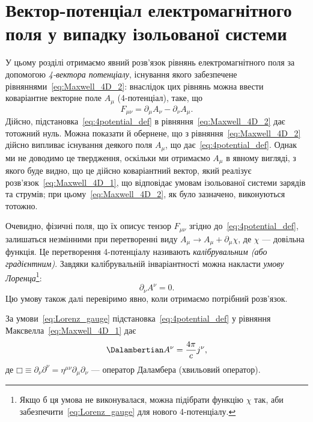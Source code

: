 \section{Вектор-потенціал електромагнітного поля у випадку ізольованої системи}

У цьому розділі отримаємо явний розв'язок рівнянь електромагнітного поля за допомогою \emph{4-вектора потенціалу}, існування якого забезпечене рівняннями~\eqref{eq:Maxwell_4D_2}: внаслідок цих рівнянь можна ввести коваріантне векторне поле $A_{\mu}$ (4-потенціал), таке, що
\begin{equation}\label{eq:4potential_def}
    F_{\mu\nu} = \partial_{\mu}A_{\nu} - \partial_{\nu}A_{\mu}.
\end{equation}
Дійсно, підстановка~\eqref{eq:4potential_def} в рівняння~\eqref{eq:Maxwell_4D_2} дає тотожний нуль. Можна показати й обернене, що з рівняння~\eqref{eq:Maxwell_4D_2} дійсно випливає існування деякого поля $A_{\mu}$, що дає~\eqref{eq:4potential_def}. Однак ми не доводимо це твердження, оскільки ми отримаємо $A_{\mu}$ в явному вигляді, з якого буде видно, що це дійсно коваріантний вектор, який реалізує розв'язок~\eqref{eq:Maxwell_4D_1}, що відповідає умовам ізольованої системи зарядів та струмів; при цьому~\eqref{eq:Maxwell_4D_2}, як було зазначено, виконуються тотожно.

Очевидно, фізичні поля, що їх описує тензор $F_{\mu\nu}$ згідно до~\eqref{eq:4potential_def}, залишаться незмінними при перетворенні виду $A_{\mu}\to A_{\mu}+\partial_{\mu}\chi$, де $\chi$ --- довільна функція. Це перетворення 4-потенціалу називають \emph{калібрувальним (або градієнтним)}. Завдяки калібрувальній інваріантності можна накласти \emph{умову Лоренца}\footnote{Якщо б ця умова не виконувалася, можна підібрати функцію $\chi$ так, аби забезпечити~\eqref{eq:Lorenz_gauge} для нового 4-потенціалу.}:
\begin{equation}\label{eq:Lorenz_gauge}
    \partial_{\nu}A^{\nu} = 0.
\end{equation}
Цю умову також далі перевіримо явно, коли отримаємо потрібний розв'язок.

За умови~\eqref{eq:Lorenz_gauge} підстановка~\eqref{eq:4potential_def} у рівняння Максвелла~\eqref{eq:Maxwell_4D_1} дає
\begin{equation}\label{eq:wave_eq_A}
    \Dalambertian A^{\nu} = \frac{4\pi}{c}j^{\nu},
\end{equation}
де $\mdlgwhtsquare \equiv \partial_{\nu}\partial^{\nu} = \eta^{\mu\nu}\partial_{\mu}\partial_{\nu}$ --- оператор Даламбера (хвильовий оператор).

